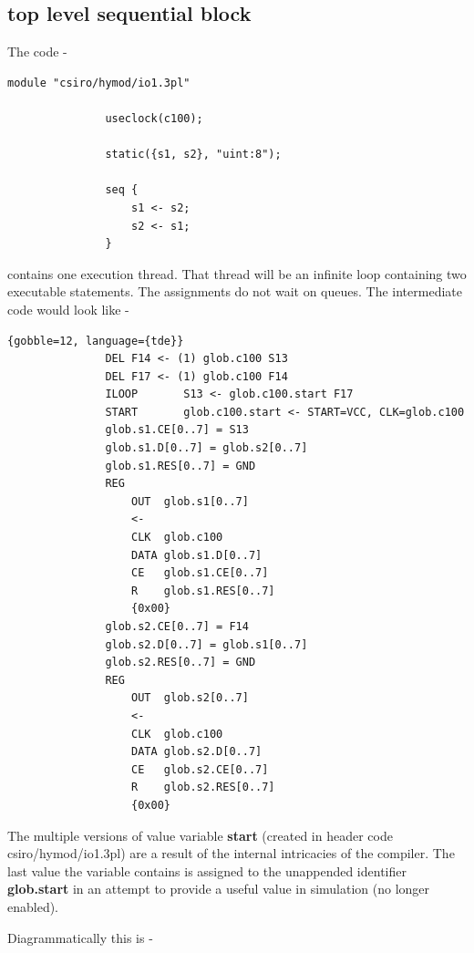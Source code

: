         \subsection{top level sequential block}

            The code -
            \begin{lstlisting}[gobble=12, language=threepl]
               module "csiro/hymod/io1.3pl"

               useclock(c100);

               static({s1, s2}, "uint:8");

               seq {
                   s1 <- s2;
                   s2 <- s1;
               }
            \end{lstlisting}
            contains one execution thread. That thread will be an infinite loop
            containing two executable statements. The assignments do not wait on
            queues. The intermediate code would look like -
            \begin{lstlisting}{gobble=12, language={tde}}
               DEL F14 <- (1) glob.c100 S13
               DEL F17 <- (1) glob.c100 F14
               ILOOP       S13 <- glob.c100.start F17
               START       glob.c100.start <- START=VCC, CLK=glob.c100
               glob.s1.CE[0..7] = S13
               glob.s1.D[0..7] = glob.s2[0..7]
               glob.s1.RES[0..7] = GND
               REG
                   OUT  glob.s1[0..7]
                   <-
                   CLK  glob.c100
                   DATA glob.s1.D[0..7]
                   CE   glob.s1.CE[0..7]
                   R    glob.s1.RES[0..7]
                   {0x00}
               glob.s2.CE[0..7] = F14
               glob.s2.D[0..7] = glob.s1[0..7]
               glob.s2.RES[0..7] = GND
               REG
                   OUT  glob.s2[0..7]
                   <-
                   CLK  glob.c100
                   DATA glob.s2.D[0..7]
                   CE   glob.s2.CE[0..7]
                   R    glob.s2.RES[0..7]
                   {0x00}
            \end{lstlisting}
            The multiple versions of value variable {\bf start} (created
            in header code csiro/hymod/io1.3pl) are a result of the internal
            intricacies of the compiler. The last value the variable contains
            is assigned to the unappended identifier {\bf glob.start}
            in an attempt to provide a useful value in simulation (no longer
            enabled).

            Diagrammatically this is -

